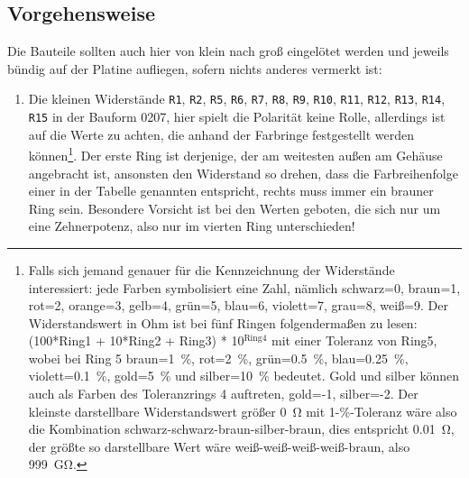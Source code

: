 \documentclass[paper=a4, open=any]{scrbook}
\begin{document}
				\subsection*{Vorgehensweise}
					Die Bauteile sollten auch hier von klein nach groß eingelötet werden und jeweils bündig auf der Platine aufliegen, sofern nichts anderes vermerkt ist:
					\begin{enumerate}
						\item Die kleinen Widerstände \texttt{R1}, \texttt{R2}, \texttt{R5}, \texttt{R6}, \texttt{R7}, \texttt{R8}, \texttt{R9}, \texttt{R10}, \texttt{R11}, \texttt{R12}, \texttt{R13}, \texttt{R14}, \texttt{R15} in der Bauform 0207, hier spielt die Polarität keine Rolle, allerdings ist auf die Werte zu achten, die anhand der Farbringe festgestellt werden können\footnote{Falls sich jemand genauer für die Kennzeichnung der Widerstände interessiert: jede Farben symbolisiert eine Zahl, nämlich schwarz=0, braun=1, rot=2, orange=3, gelb=4, grün=5, blau=6, violett=7, grau=8, weiß=9. Der Widerstandswert in Ohm ist bei fünf Ringen folgendermaßen zu lesen: (100*Ring1 + 10*Ring2 + Ring3) * 10$^{\text{Ring4}}$ mit einer Toleranz von Ring5, wobei bei Ring 5 braun=\SI{1}{\percent}, rot=\SI{2}{\percent}, grün=\SI{0,5}{\percent}, blau=\SI{0,25}{\percent}, violett=\SI{0,1}{\percent}, gold=\SI{5}{\percent} und silber=\SI{10}{\percent} bedeutet. Gold und silber können auch als Farben des Toleranzrings 4 auftreten, gold=-1, silber=-2. Der kleinste darstellbare Widerstandswert größer \SI{0}{\ohm} mit 1-\%-Toleranz wäre also die Kombination schwarz-schwarz-braun-silber-braun, dies entspricht \SI{0,01}{\ohm}, der größte so darstellbare Wert wäre weiß-weiß-weiß-weiß-braun, also \SI{999}{\giga\ohm}.}. Der erste Ring ist derjenige, der am weitesten außen am Gehäuse angebracht ist, ansonsten den Widerstand so drehen, dass die Farbreihenfolge einer in der Tabelle genannten entspricht, rechts muss immer ein brauner Ring sein. Besondere Vorsicht ist bei den Werten geboten, die sich nur um eine Zehnerpotenz, also nur im vierten Ring unterschieden!


\end{enumerate}
\end{document}
